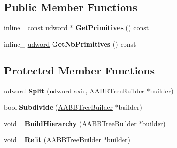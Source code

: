 \subsection*{Public Member Functions}
\begin{DoxyCompactItemize}
\item 
inline\+\_\+ const \hyperlink{IceTypes_8h_a44c6f1920ba5551225fb534f9d1a1733}{udword} $\ast$ {\bfseries Get\+Primitives} () const \hypertarget{classAABBTreeNode_a5657ae9a805b1f4242d3cad8d6776862}{}\label{classAABBTreeNode_a5657ae9a805b1f4242d3cad8d6776862}

\item 
inline\+\_\+ \hyperlink{IceTypes_8h_a44c6f1920ba5551225fb534f9d1a1733}{udword} {\bfseries Get\+Nb\+Primitives} () const \hypertarget{classAABBTreeNode_addab28e7f0dc9e2737f08a82148121a1}{}\label{classAABBTreeNode_addab28e7f0dc9e2737f08a82148121a1}

\end{DoxyCompactItemize}
\subsection*{Protected Member Functions}
\begin{DoxyCompactItemize}
\item 
\hyperlink{IceTypes_8h_a44c6f1920ba5551225fb534f9d1a1733}{udword} {\bfseries Split} (\hyperlink{IceTypes_8h_a44c6f1920ba5551225fb534f9d1a1733}{udword} axis, \hyperlink{classAABBTreeBuilder}{A\+A\+B\+B\+Tree\+Builder} $\ast$builder)\hypertarget{classAABBTreeNode_aefc4588f956b98d324b26d9dbecc20f8}{}\label{classAABBTreeNode_aefc4588f956b98d324b26d9dbecc20f8}

\item 
bool {\bfseries Subdivide} (\hyperlink{classAABBTreeBuilder}{A\+A\+B\+B\+Tree\+Builder} $\ast$builder)\hypertarget{classAABBTreeNode_a30febc55e0cd39f7114f02395e2a69f5}{}\label{classAABBTreeNode_a30febc55e0cd39f7114f02395e2a69f5}

\item 
void {\bfseries \+\_\+\+Build\+Hierarchy} (\hyperlink{classAABBTreeBuilder}{A\+A\+B\+B\+Tree\+Builder} $\ast$builder)\hypertarget{classAABBTreeNode_acf08af7ca37efb06780ef3ff433effcd}{}\label{classAABBTreeNode_acf08af7ca37efb06780ef3ff433effcd}

\item 
void {\bfseries \+\_\+\+Refit} (\hyperlink{classAABBTreeBuilder}{A\+A\+B\+B\+Tree\+Builder} $\ast$builder)\hypertarget{classAABBTreeNode_a9b07d0707b9b2d043a60672f3c9cb47a}{}\label{classAABBTreeNode_a9b07d0707b9b2d043a60672f3c9cb47a}

\end{DoxyCompactItemize}
